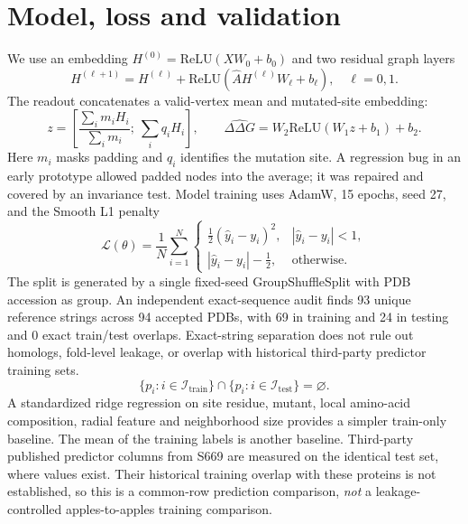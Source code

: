 \documentclass[11pt]{article}
\begin{document}
\section{Model, loss and validation}
We use an embedding $H^{(0)}=\mathrm{ReLU}(XW_0+b_0)$ and two residual graph layers
\begin{equation}H^{(\ell+1)}=H^{(\ell)}+\mathrm{ReLU}(\widehat A H^{(\ell)}W_{\ell}+b_{\ell}),\quad\ell=0,1.\end{equation}
The readout concatenates a valid-vertex mean and mutated-site embedding:
\begin{equation}z=\left[\frac{\sum_i m_iH_i}{\sum_i m_i};\ \sum_i q_i H_i\right],\qquad \widehat{\Delta\Delta G}=W_2\mathrm{ReLU}(W_1z+b_1)+b_2.\end{equation}
Here $m_i$ masks padding and $q_i$ identifies the mutation site. A regression bug in an early prototype allowed padded nodes into the average; it was repaired and covered by an invariance test. Model training uses AdamW, 15 epochs, seed 27, and the Smooth L1 penalty
\begin{equation}\mathcal L(\theta)=\frac1N\sum_{i=1}^{N}\begin{cases}\frac12(\widehat y_i-y_i)^2,&|\widehat y_i-y_i|<1,\\|\widehat y_i-y_i|-\frac12,&\text{otherwise.}\end{cases}\end{equation}
The split is generated by a single fixed-seed GroupShuffleSplit with PDB accession as group. An independent exact-sequence audit finds 93 unique reference strings across 94 accepted PDBs, with 69 in training and 24 in testing and 0 exact train/test overlaps. Exact-string separation does not rule out homologs, fold-level leakage, or overlap with historical third-party predictor training sets. \begin{equation}\{p_i:i\in\mathcal I_{\mathrm{train}}\}\cap\{p_i:i\in\mathcal I_{\mathrm{test}}\}=\varnothing.\end{equation}
A standardized ridge regression on site residue, mutant, local amino-acid composition, radial feature and neighborhood size provides a simpler train-only baseline. The mean of the training labels is another baseline. Third-party published predictor columns from S669 are measured on the identical test set, where values exist. Their historical training overlap with these proteins is not established, so this is a common-row prediction comparison, \emph{not} a leakage-controlled apples-to-apples training comparison.
\end{document}
